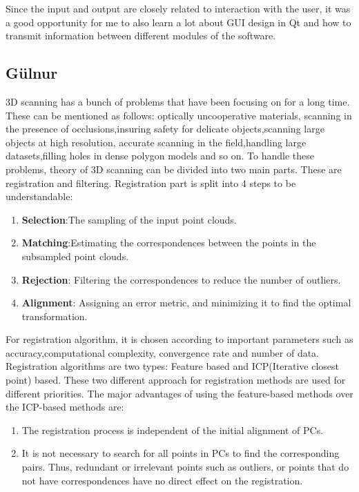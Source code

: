 \documentclass[aps,letterpaper,11pt]{revtex4}
\begin{document}
Since the input and output are closely related to interaction with the user, it was a good opportunity for me to also learn a lot about GUI design in Qt and how to transmit information between different modules of the software.\par

\subsection{Gülnur}


3D scanning has a bunch of problems that have been focusing on for a long time. These can be mentioned as follows: optically uncooperative materials, scanning in the presence of occlusions,insuring safety for delicate objects,scanning large objects at high resolution, accurate scanning in the field,handling large datasets,filling holes in dense polygon models  and so on. To handle these problems, theory of 3D scanning can be divided into two main parts. These are registration and filtering. Registration part is split into 4 steps to be understandable:
\begin{enumerate}
  \item \textbf{Selection}:The sampling of the input point clouds.
 \item \textbf{Matching}:Estimating the correspondences between the points in the subsampled point clouds.
  \item \textbf{Rejection}: Filtering the correspondences to reduce the number of outliers.
\item \textbf{Alignment}: Assigning an error metric, and minimizing it to find the optimal transformation.
\end{enumerate}
For registration algorithm, it is chosen according to important parameters such as accuracy,computational complexity, convergence rate and number of data. Registration algorithms are two types: Feature based and ICP(Iterative closest point) based. These two different approach for registration methods are used for different priorities. The major advantages of using the feature-based methods over the ICP-based methods are: 
\begin{enumerate}
\item The registration process is independent of the initial
alignment of PCs.
\item  It is not necessary to search for all points in PCs to find the corresponding pairs. Thus, redundant or irrelevant points such as outliers, or points that do not have correspondences have no direct effect on the registration.
\end{enumerate}
\end{document}
